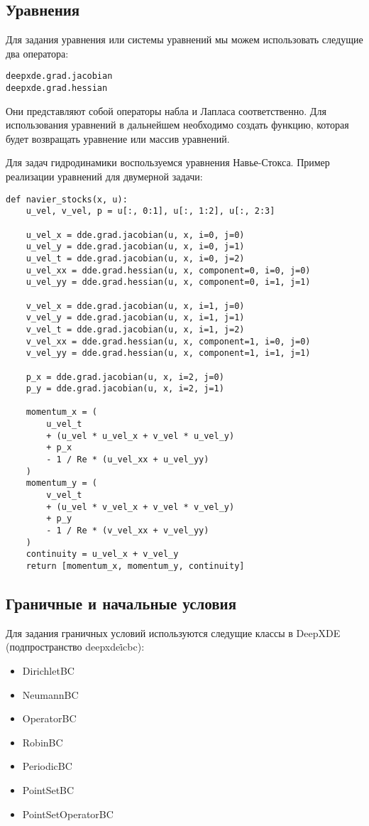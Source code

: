 \subsection{Уравнения}
Для задания уравнения или системы уравнений мы можем использовать следущие два оператора:
\begin{verbatim}
deepxde.grad.jacobian
deepxde.grad.hessian
\end{verbatim}
Они представляют собой операторы набла и Лапласа соответственно. Для использования уравнений
в дальнейшем необходимо создать функцию, которая будет возвращать уравнение или массив уравнений.

Для задач гидродинамики воспользуемся уравнения Навье-Стокса. Пример реализации уравнений
для двумерной задачи:
\begin{verbatim}
def navier_stocks(x, u):
    u_vel, v_vel, p = u[:, 0:1], u[:, 1:2], u[:, 2:3]

    u_vel_x = dde.grad.jacobian(u, x, i=0, j=0)
    u_vel_y = dde.grad.jacobian(u, x, i=0, j=1)
    u_vel_t = dde.grad.jacobian(u, x, i=0, j=2)
    u_vel_xx = dde.grad.hessian(u, x, component=0, i=0, j=0)
    u_vel_yy = dde.grad.hessian(u, x, component=0, i=1, j=1)

    v_vel_x = dde.grad.jacobian(u, x, i=1, j=0)
    v_vel_y = dde.grad.jacobian(u, x, i=1, j=1)
    v_vel_t = dde.grad.jacobian(u, x, i=1, j=2)
    v_vel_xx = dde.grad.hessian(u, x, component=1, i=0, j=0)
    v_vel_yy = dde.grad.hessian(u, x, component=1, i=1, j=1)

    p_x = dde.grad.jacobian(u, x, i=2, j=0)
    p_y = dde.grad.jacobian(u, x, i=2, j=1)

    momentum_x = (
        u_vel_t
        + (u_vel * u_vel_x + v_vel * u_vel_y)
        + p_x
        - 1 / Re * (u_vel_xx + u_vel_yy)
    )
    momentum_y = (
        v_vel_t
        + (u_vel * v_vel_x + v_vel * v_vel_y)
        + p_y
        - 1 / Re * (v_vel_xx + v_vel_yy)
    )
    continuity = u_vel_x + v_vel_y
    return [momentum_x, momentum_y, continuity]
\end{verbatim}

\subsection{Граничные и начальные условия}
Для задания граничных условий используются следущие классы в DeepXDE (подпространство deepxde\.icbc):
\begin{itemize}
\item DirichletBC
\item NeumannBC
\item OperatorBC
\item RobinBC
\item PeriodicBC
\item PointSetBC
\item PointSetOperatorBC
\end{itemize}

